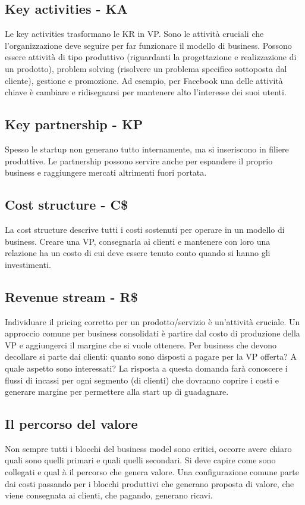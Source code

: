\subsection{Key activities - KA}

Le key activities trasformano le KR in VP. Sono le attività cruciali che
l'organizzazione deve seguire per far funzionare il modello di business.
Possono essere attività di tipo produttivo (riguardanti la progettazione e
realizzazione di un prodotto), problem solving (risolvere un problema specifico
sottoposta dal cliente), gestione e promozione. Ad esempio, per Facebook una
delle attività chiave è cambiare e ridisegnarsi per mantenere alto l'interesse
dei suoi utenti.

\subsection{Key partnership - KP}

Spesso le startup non generano tutto internamente, ma si inseriscono in filiere
produttive. Le partnership possono servire anche per espandere il proprio
business e raggiungere mercati altrimenti fuori portata.

\subsection{Cost structure - C\$}

La cost structure descrive tutti i costi sostenuti per operare in un modello di
business. Creare una VP, consegnarla ai clienti e mantenere con loro una
relazione ha un costo di cui deve essere tenuto conto quando si hanno gli
investimenti.

\subsection{Revenue stream - R\$}

Individuare il pricing corretto per un prodotto/servizio è un'attività
cruciale. Un approccio comune per business consolidati è partire dal costo di
produzione della VP e aggiungerci il margine che si vuole ottenere.
Per business che devono decollare si parte dai clienti: quanto sono disposti a
pagare per la VP offerta? A quale aspetto sono interessati? La risposta
a questa domanda farà conoscere i flussi di incassi per ogni segmento
(di clienti) che dovranno coprire i costi e generare margine per permettere
alla start up di guadagnare.

\subsection{Il percorso del valore}

Non sempre tutti i blocchi del business model sono critici, occorre avere
chiaro quali sono quelli primari e quali quelli secondari. Si deve capire come
sono collegati e qual à il percorso che genera valore. Una configurazione
comune parte dai costi passando per i blocchi produttivi che generano proposta
di valore, che viene consegnata ai clienti, che pagando, generano ricavi.
